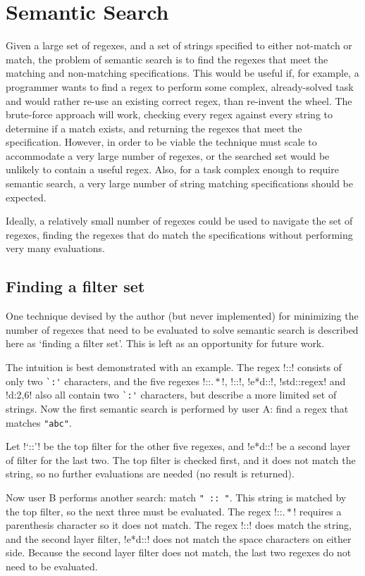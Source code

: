 \section{Semantic Search}
Given a large set of regexes, and a set of strings specified to either not-match or match, the problem of semantic search is to find the regexes that meet the matching and non-matching specifications.  This would be useful if, for example, a programmer wants to find a regex to perform some complex, already-solved task and would rather re-use an existing correct regex, than re-invent the wheel.  The brute-force approach will work, checking every regex against every string to determine if a match exists, and returning the regexes that meet the specification.  However, in order to be viable the technique must scale to accommodate a very large number of regexes, or the searched set would be unlikely to contain a useful regex.  Also, for a task complex enough to require semantic search, a very large number of string matching specifications should be expected.

Ideally, a relatively small number of regexes could be used to navigate the set of regexes, finding the regexes that do match the specifications without performing very many evaluations.

\subsection{Finding a filter set} One technique devised by the author (but never implemented) for minimizing the number of regexes that need to be evaluated to solve semantic search is described here as `finding a filter set'.  This is left as an opportunity for future work.

The intuition is best demonstrated with an example.  The regex \cverb!::! consists of only two \verb!`:'! characters, and the five regexes \cverb!::\(.*\)!, \cverb!\s*::\s*!, \cverb!e*d::!, \cverb!std::regex! and \cverb!d:{2,6}! also all contain two \verb!`:'! characters, but describe a more limited set of strings.  Now the first semantic search is performed by user A: find a regex that matches \verb!"abc"!.

Let \cverb!`::'! be the top filter for the other five regexes, and \cverb!e*d::! be a second layer of filter for the last two.  The top filter is checked first, and it does not match the string, so no further evaluations are needed (no result is returned).

Now user B performs another search: match \verb!" :: "!.  This string is matched by the top filter, so the next three must be evaluated.  The regex \cverb!::\(.*\)! requires a parenthesis character so it does not match.  The regex \cverb!\s*::\s*! does match the string, and the second layer filter, \cverb!e*d::! does not match the space characters on either side.  Because the second layer filter does not match, the last two regexes do not need to be evaluated.

